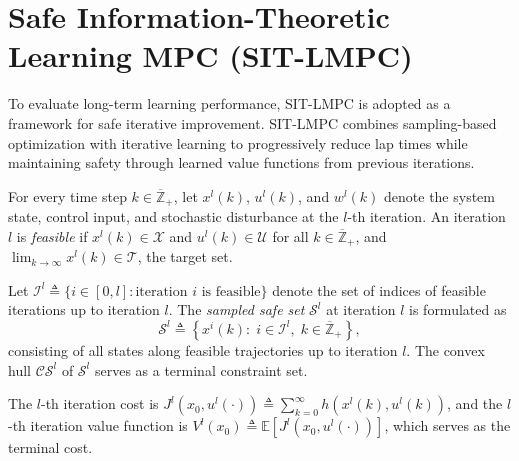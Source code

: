 \section{Safe Information-Theoretic Learning MPC (SIT-LMPC)}
\label{sec:sitlmpc}

To evaluate long-term learning performance, SIT-LMPC is adopted as a framework for safe iterative improvement. SIT-LMPC combines sampling-based optimization with iterative learning to progressively reduce lap times while maintaining safety through learned value functions from previous iterations.

For every time step $k \in \overline{\mathbb{Z}}_{+}$, let $x^{l}(k)$, $u^{l}(k)$, and $w^{l}(k)$ denote the system state, control input, and stochastic disturbance at the $l$-th iteration. An iteration $l$ is \textit{feasible} if $x^{l}(k) \in \mathcal{X}$ and $u^{l}(k) \in \mathcal{U}$ for all $k \in \overline{\mathbb{Z}}_{+}$, and $\lim_{k \rightarrow \infty} x^{l}(k) \in \mathcal{T}$, the target set.

Let $\mathcal{I}^l \triangleq \{ i \in [0, l] : \text{iteration } i \text{ is feasible}\}$ denote the set of indices of feasible iterations up to iteration $l$. The \textit{sampled safe set} $\mathcal{S}^l$ at iteration $l$ is formulated as
\begin{equation}
  \mathcal{S}^{l} \triangleq \left\{x^{i}(k) :\;  i \in \mathcal{I}^{l},\; k \in \overline{\mathbb{Z}}_{+} \right\},
\end{equation}
consisting of all states along feasible trajectories up to iteration $l$. The convex hull $\mathcal{CS}^l$ of $\mathcal{S}^l$ serves as a terminal constraint set.

The $l$-th iteration cost is $J^{l}(x_0, u^{l}(\cdot)) \triangleq \sum_{k=0}^{\infty} h(x^{l}(k), u^{l}(k))$, and the $l$-th iteration value function is $V^l(x_0) \triangleq \mathbb{E}[J^{l}(x_0, u^{l}(\cdot))]$, which serves as the terminal cost.

